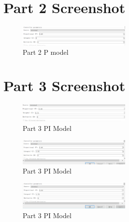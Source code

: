 \documentclass[11pt, a4paper]{article}
\begin{document}
\newpage

\section{Part 2 Screenshot}

\begin{figure}[htbp]     \begin{centering}
    \includegraphics[width=0.5\textwidth]{a2.png}
    \caption{Part 2 P model}
    \end{centering}
\end{figure}

\section{Part 3 Screenshot}

\begin{figure}[htbp]     \begin{centering}
    \includegraphics[width=0.5\textwidth]{a3_1_1.png}
    \caption{Part 3 PI Model}
    \end{centering}
\end{figure}

\begin{figure}[htbp]     \begin{centering}
    \includegraphics[width=0.5\textwidth]{a3_1_2.png}
    \caption{Part 3 PI Model}
    \end{centering}
\end{figure}

\begin{figure}[htbp]     \begin{centering}
    \includegraphics[width=0.5\textwidth]{a3_1_3.png}
    \caption{Part 3 PI Model}
    \end{centering}
\end{figure}
\end{document}

